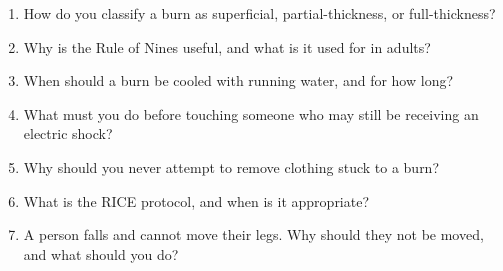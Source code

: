 \begin{enumerate}[leftmargin=*]
\item How do you classify a burn as superficial, partial-thickness, or full-thickness?
\item Why is the Rule of Nines useful, and what is it used for in adults?
\item When should a burn be cooled with running water, and for how long?
\item What must you do before touching someone who may still be receiving an electric shock?
\item Why should you never attempt to remove clothing stuck to a burn?
\item What is the RICE protocol, and when is it appropriate?
\item A person falls and cannot move their legs. Why should they not be moved, and what should you do?
\end{enumerate}
